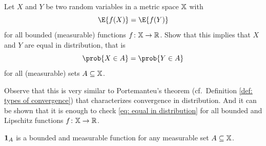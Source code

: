 \begin{exercise}
    \label{ex: equal in distribution}
    Let \(X\) and \(Y\) be two random variables in a metric space \(\mathbb{X}\) with
    \begin{equation}
        \label{eq: equal in distribution}    
        \E{f(X)} = \E{f(Y)}
    \end{equation}
    for all bounded (measurable) functions \(f\colon \mathbb{X} \to \mathbb{R}\). Show
    that this implies that \(X\) and \(Y\) are equal in distribution, that is
    \[
        \prob{X \in A} = \prob{Y \in A}
    \]
    for all (measurable) sets \(A\subseteq \mathbb{X}\).
    
\begin{remark}
    Observe that this is very similar to Portemanteu's theorem (cf.~Definition
    \ref{def: types of convergence}) that characterizes convergence in
    distribution. And it can be shown that it is enough to check \eqref{eq:
    equal in distribution} for all bounded and Lipschitz functions \(f\colon
    \mathbb{X} \to \mathbb{R}\).
\end{remark}
    \begin{solution}
        \(\ind{A}\) is a bounded and measurable function for any measurable set \(A\subseteq \mathbb{X}\).
    \end{solution}
\end{exercise}


